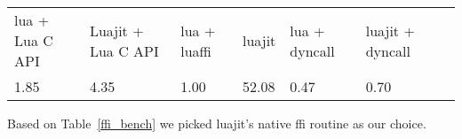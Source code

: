 \begin{tabular}{|l|l|l|l|l|l|l} \hline \hline
\label{ffi_bench}
lua + Lua C API & Luajit + Lua C API & lua + luaffi & luajit & lua + dyncall & luajit + dyncall \\
1.85 & 4.35 & 1.00 & 52.08 & 0.47 & 0.70 \\
\hline
\end{tabular}
Based on Table~\ref{ffi_bench} we picked luajit's native ffi routine as our choice. 
